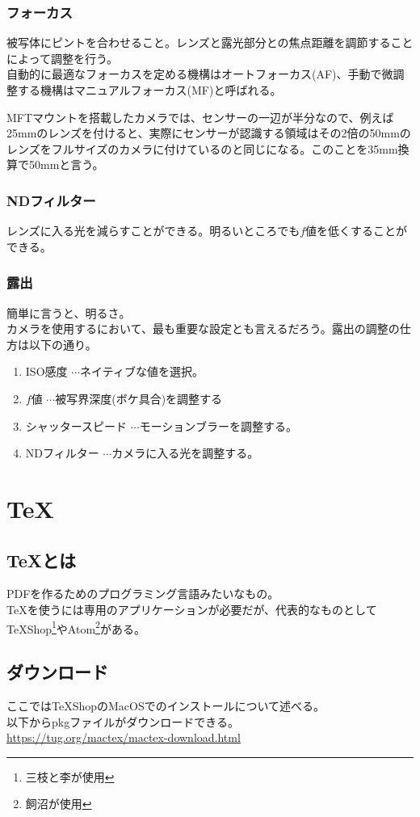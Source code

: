 \documentclass[dvipdfmx,jb5]{jreport}
\begin{document}
\subsubsection{フォーカス}
被写体にピントを合わせること。レンズと露光部分との焦点距離を調節することによって調整を行う。\\自動的に最適なフォーカスを定める機構はオートフォーカス(AF)、手動で微調整する機構はマニュアルフォーカス(MF)と呼ばれる。
\begin{boxnote}
      MFTマウントを搭載したカメラでは、センサーの一辺が半分なので、例えば25mmのレンズを付けると、実際にセンサーが認識する領域はその2倍の50mmのレンズをフルサイズのカメラに付けているのと同じになる。このことを35mm換算で50mmと言う。
\end{boxnote}
\subsubsection{NDフィルター}
レンズに入る光を減らすことができる。明るいところでも$f値$を低くすることができる。
\subsubsection{露出}
簡単に言うと、明るさ。\\
カメラを使用するにおいて、最も重要な設定とも言えるだろう。露出の調整の仕方は以下の通り。
\begin{enumerate}[{手順}1]
      \item ISO感度 $\cdots$ネイティブな値を選択。
      \item $f値$ $\cdots$被写界深度(ボケ具合)を調整する
      \item シャッタースピード $\cdots$モーションブラーを調整する。
      \item NDフィルター $\cdots$カメラに入る光を調整する。
\end{enumerate}

\section{\TeX}
\subsection{\TeX とは}
PDFを作るためのプログラミング言語みたいなもの。\\
\TeX を使うには専用のアプリケーションが必要だが、代表的なものとしてTeXShop\footnote{三枝と李が使用}やAtom\footnote{飼沼が使用}がある。
\subsection{ダウンロード}
ここではTeXShopのMacOSでのインストールについて述べる。\\
以下からpkgファイルがダウンロードできる。\\
\url{https://tug.org/mactex/mactex-download.html}
\end{document}
